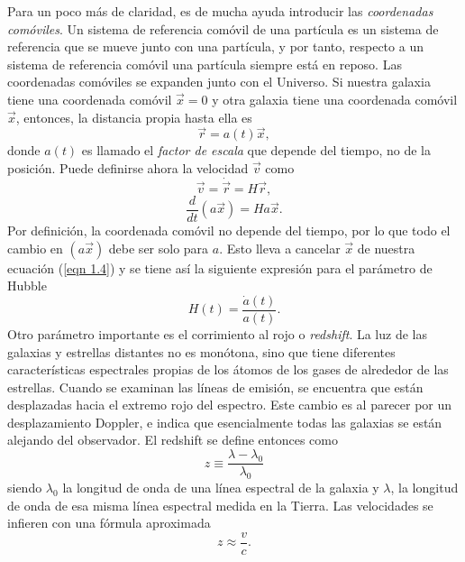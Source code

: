 \documentclass[a4paper,openright,12pt]{book}
\begin{document}
Para un poco más de claridad, es de mucha ayuda introducir las \textit{coordenadas comóviles}. Un sistema de referencia comóvil de una partícula es un sistema de referencia que se mueve junto con una partícula, y por tanto, respecto a un sistema de referencia comóvil una partícula siempre está en reposo. Las coordenadas comóviles se expanden junto con el Universo. Si nuestra galaxia tiene una coordenada comóvil $\vec{x}=0$ y otra galaxia tiene una coordenada comóvil $\vec{x}$, entonces, la distancia propia hasta ella es
\begin{equation}
\vec{r} = a(t)\vec{x},\label{eqn 1.2}
\end{equation}
donde $a(t)$ es llamado el \textit{factor de escala} que depende del tiempo, no de la posición. Puede definirse ahora la velocidad $\vec{v}$ como 
\begin{equation}
\vec{v} = \dot{\vec{r}} = H\vec{r},\label{eqn 1.3}
\end{equation}
\begin{equation}
\frac{d}{dt}(a\vec{x})= Ha\vec{x}.\label{eqn 1.4}
\end{equation} 
Por definición, la coordenada comóvil no depende del tiempo, por lo que todo el cambio en $(a\vec{x})$ debe ser solo para $a$. Esto lleva a cancelar $\vec{x}$ de nuestra ecuación (\ref{eqn 1.4}) y se tiene así la siguiente expresión para el parámetro de Hubble
\begin{equation}
H(t) = \frac{\dot{a}(t)}{a(t)}.\label{eqn 1.5}
\end{equation}
Otro parámetro importante es el corrimiento al rojo o \textit{redshift}. La luz de las galaxias y estrellas distantes no es monótona, sino que tiene diferentes características espectrales propias de los átomos de los gases de alrededor de las estrellas. Cuando se examinan las líneas de emisión, se encuentra que están desplazadas hacia el extremo rojo del espectro. Este cambio es al parecer por un desplazamiento Doppler, e indica que esencialmente todas las galaxias se están alejando del observador. El redshift se define entonces como 
\begin{equation}
 z \equiv \frac{\lambda - \lambda_{0}}{\lambda_{0}}\label{eqn 1.6}
\end{equation}
siendo $\lambda_{0}$ la longitud de onda de una línea espectral de la galaxia y $\lambda$, la longitud de onda de esa misma línea espectral medida en la Tierra. Las velocidades se infieren con una fórmula aproximada 
\begin{equation*}
z \approx \frac{v}{c}.
\end{equation*}
\end{document}
